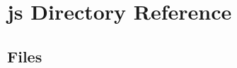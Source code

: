 \section{js Directory Reference}
\label{dir_2867b8401105090ba43035c8b1fd9c0c}
\subsection*{Files}
\begin{DoxyCompactItemize}
\end{DoxyCompactItemize}
